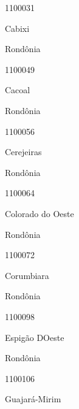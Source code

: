 \documentclass[
  letterpaper,
]{report}
\begin{document}
1100031

\n      

Cabixi

\n    

\n    

\n      

Rondônia

\n      

1100049

\n      

Cacoal

\n    

\n    

\n      

Rondônia

\n      

1100056

\n      

Cerejeiras

\n    

\n    

\n      

Rondônia

\n      

1100064

\n      

Colorado do Oeste

\n    

\n    

\n      

Rondônia

\n      

1100072

\n      

Corumbiara

\n    

\n    

\n      

Rondônia

\n      

1100098

\n      

Espigão D\textquotesingle Oeste

\n    

\n    

\n      

Rondônia

\n      

1100106

\n      

Guajará-Mirim

\n    
\end{document}
